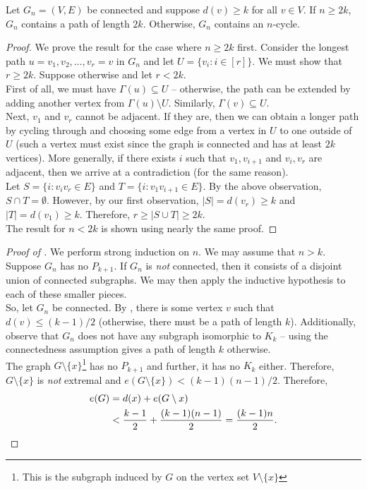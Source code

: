 		\begin{flem}
			\label{theo: 1.8}
			Let $G_n = (V,E)$ be connected and suppose $d(v) \ge k$ for all $v\in V$. If $n\ge 2k$, $G_n$ contains a path of length $2k$. Otherwise, $G_n$ contains an $n$-cycle.
		\end{flem}
		\begin{proof}
			We prove the result for the case where $n\ge 2k$ first. Consider the longest path $u = v_1, v_2, \ldots, v_r = v$ in $G_n$ and let $U = \{v_i : i \in [r]\}$. We must show that $r \ge 2k$. Suppose otherwise and let $r < 2k$.\\
			First of all, we must have $\Gamma(u) \subseteq U$ -- otherwise, the path can be extended by adding another vertex from $\Gamma(u) \setminus U$. Similarly, $\Gamma(v) \subseteq U$.\\
			Next, $v_1$ and $v_r$ cannot be adjacent. If they are, then we can obtain a longer path by cycling through and choosing some edge from a vertex in $U$ to one outside of $U$ (such a vertex must exist since the graph is connected and has at least $2k$ vertices).
			More generally, if there exists $i$ such that $v_1, v_{i+1}$ and $v_i, v_r$ are adjacent, then we arrive at a contradiction (for the same reason).\\
			Let $S = \{i : v_iv_r \in E\}$ and $T = \{i : v_1v_{i+1} \in E\}$. By the above observation, $S \cap T = \emptyset$. However, by our first observation, $|S| = d(v_r) \ge k$ and $|T| = d(v_1) \ge k$. Therefore, $r \ge |S \cup T| \ge 2k$.\\
			The result for $n < 2k$ is shown using nearly the same proof.
		\end{proof}

		\begin{proof}[Proof of ]
			We perform strong induction on $n$. We may assume that $n > k$. Suppose $G_n$ has no $P_{k+1}$. If $G_n$ is \emph{not} connected, then it consists of a disjoint union of connected subgraphs. We may then apply the inductive hypothesis to each of these smaller pieces.\\
			So, let $G_n$ be connected. By , there is some vertex $v$ such that $d(v) \le (k-1)/2$ (otherwise, there must be a path of length $k$). Additionally, observe that $G_n$ does not have any subgraph isomorphic to $K_k$ -- using the connectedness assumption gives a path of length $k$ otherwise.\\
			The graph $G \setminus \{x\}$\footnote{This is the subgraph induced by $G$ on the vertex set $V\setminus\{x\}$} has no $P_{k+1}$ and further, it has no $K_k$ either. Therefore, $G \setminus \{x\}$ is \emph{not} extremal and $e(G \setminus \{x\}) < (k-1)(n-1)/2$. Therefore,
			\begin{align*}
				e(G) &= d(x) + e(G \setminus x) \\
					&< \frac{k-1}{2} + \frac{(k-1)(n-1)}{2} = \frac{(k-1)n}{2}. \qedhere
			\end{align*}
		\end{proof}

\clearpage